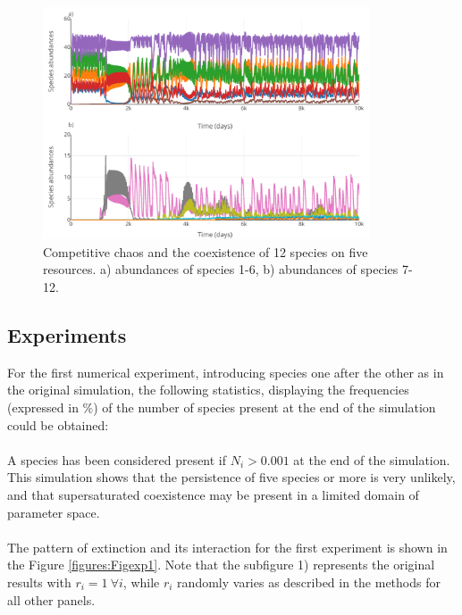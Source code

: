 \begin{figure}[H]
\begin{center} 
 \includegraphics[width=0.86\textwidth]{../Code/Figures/Figure_4.pdf}
  \caption{Competitive chaos and the coexistence of 12 species on five resources. a) abundances of species 1-6, b) abundances of species 7-12.}
  \label{figures:Fig4}
\end{center}
  \end{figure}

\subsection{Experiments}

For the first numerical experiment, introducing species one after the other as in the 
original simulation, the following statistics, displaying the frequencies 
(expressed in \%) of the number of species present at the end of the simulation 
could be obtained: \\


\\
A species has been considered present if $N_i > 0.001$ at the end of the simulation. This simulation shows that the persistence of five species or more is very unlikely, and that supersaturated coexistence may be present in a limited domain of parameter space.\\
\\
The pattern of extinction and its interaction for the first experiment is shown in the Figure \ref{figures:Figexp1}. Note that the subfigure 1) represents the original results with $r_i=1 ~\forall i$, while $r_i$ randomly varies as described in the methods for all other panels.

